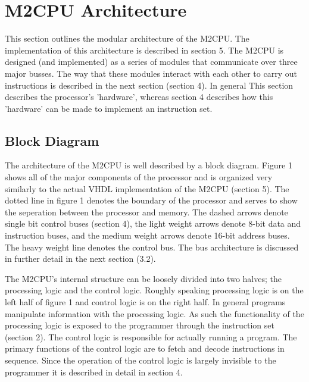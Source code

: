 \documentclass[a4paper,12pt]{article}
\newcommand{\mt}{M2CPU}
\begin{document}
\newpage
\section{\mt{} Architecture}
This section outlines the modular architecture of the \mt{}. The implementation
of this architecture is described in section 5. The \mt{} is designed (and 
implemented) as a series of modules that communicate over three major busses. 
The way that these modules interact with each other to carry out instructions is
described in the next section (section 4). In general This section describes the 
processor's 'hardware', whereas section 4 describes how this 'hardware' can be 
made to implement an instruction set.
\par

\subsection{Block Diagram}
The architecture of the \mt{} is well described by a block diagram. Figure 1
shows all of the major components of the processor and is organized very 
similarly to the actual VHDL implementation of the \mt{} (section 5). The 
dotted line in figure 1 denotes the boundary of the processor and serves to 
show the seperation between the processor and memory. The dashed arrows denote
single bit control buses (section 4), the light weight arrows denote 8-bit data
and instruction buses, and the medium weight arrows denote 16-bit address buses. 
The heavy weight line denotes the control bus. The bus architecture is 
discussed in further detail in the next section (3.2).
\par

The \mt{}'s internal structure can be loosely divided into two halves; the
processing logic and the control logic. Roughly speaking processing logic is on
the left half of figure 1 and control logic is on the right half. In general 
programs manipulate information with the processing logic. As such the 
functionality of the processing logic is exposed to the programmer through the
instruction set (section 2). The control logic is responsible for actually 
running a program. The primary functions of the control logic are to fetch and 
decode instructions in sequence. Since the operation of the control logic is 
largely invisible to the programmer it is described in detail in section 4.
\par
\end{document}
